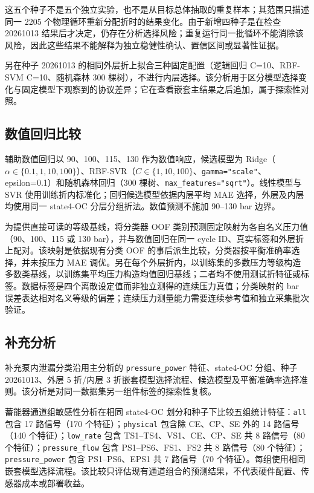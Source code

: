 \documentclass[UTF8,12pt,a4paper]{ctexart}
\begin{document}
这五个种子不是五个独立实验，也不是从目标总体抽取的重复样本；其范围只描述同一 2205 个物理循环重新分配折时的结果变化。由于新增四种子是在检查 20261013 结果后才决定，仍存在分析选择风险；重复运行同一批循环不能消除该风险，因此这些结果不能解释为独立稳健性确认、置信区间或显著性证据。

另在种子 20261013 的相同外层折上拟合三种固定配置（逻辑回归 C=10、RBF-SVM C=10、随机森林 300 棵树），不进行内层选择。该分析用于区分模型选择变化与固定模型下观察到的协议差异；它在查看嵌套主结果之后追加，属于探索性对照。

\subsection{数值回归比较}
辅助数值回归以 90、100、115、130 作为数值响应，候选模型为 Ridge（$\alpha\in\{0.1, 1, 10, 100\}$）、RBF-SVR（$C\in\{1, 10, 100\}$、\texttt{gamma="scale"}、epsilon=0.1）和随机森林回归（300 棵树、\texttt{max\_features="sqrt"}）。线性模型与 SVR 使用训练折内标准化；回归候选模型依据内层平均 MAE 选择，外层及内层均使用同一 state4-OC 分层分组折法。数值预测不施加 90–130 bar 边界。

为提供直接可读的等级基线，将分类器 OOF 类别预测固定映射为各自名义压力值（90、100、115 或 130 bar），并与数值回归在同一 cycle ID、真实标签和外层折上配对。该映射是依据现有分类 OOF 的事后派生比较，分类器按平衡准确率选择，并未按压力 MAE 调优。另在每个外层折内，以训练集的多数压力等级构造多数类基线，以训练集平均压力构造均值回归基线；二者均不使用测试折特征或标签。数据标签是四个离散设定值而非独立测得的连续压力真值；分类映射的 bar 误差表达相对名义等级的偏差；连续压力测量能力需要连续参考值和独立采集批次验证。

\subsection{补充分析}
补充泵内泄漏分类沿用主分析的 \texttt{pressure\_power} 特征、state4-OC 分组、种子 20261013、外层 5 折/内层 3 折嵌套模型选择流程、候选模型及平衡准确率选择准则。该分析是对同一数据集另一组件标签的探索性复核。

蓄能器通道组敏感性分析在相同 state4-OC 划分和种子下比较五组统计特征：\texttt{all} 包含 17 路信号（170 个特征）；\texttt{physical} 包含除 CE、CP、SE 外的 14 路信号（140 个特征）；\texttt{low\_rate} 包含 TS1–TS4、VS1、CE、CP、SE 共 8 路信号（80 个特征）；\texttt{pressure\_flow} 包含 PS1–PS6、FS1、FS2 共 8 路信号（80 个特征）；\texttt{pressure\_power} 包含 PS1–PS6、EPS1 共 7 路信号（70 个特征）。每组使用相同嵌套模型选择流程。该比较只评估现有通道组合的预测结果，不代表硬件配置、传感器成本或部署收益。
\end{document}
